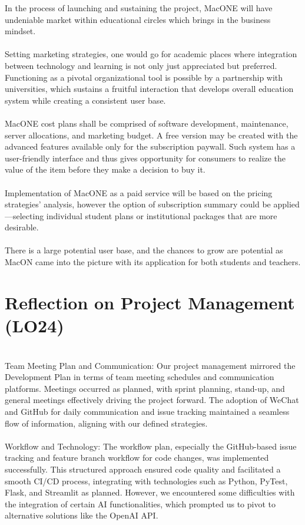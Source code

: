 \documentclass{article}
\begin{document}
In the process of launching and sustaining the project, MacONE will have undeniable market within educational circles which brings in the business mindset.\\
\\
Setting marketing strategies, one would go for academic places where integration between technology and learning is not only just appreciated but preferred. Functioning as a pivotal organizational tool is possible by a partnership with universities, which sustains a fruitful interaction that develops overall education system while creating a consistent user base.\\
\\
MacONE cost plans shall be comprised of software development, maintenance, server allocations, and marketing budget. A free version may be created with the advanced features available only for the subscription paywall. Such system has a user-friendly interface and thus gives opportunity for consumers to realize the value of the item before they make a decision to buy it.\\
\\
Implementation of MacONE as a paid service will be based on the pricing strategies' analysis, however the option of subscription summary could be applied—selecting individual student plans or institutional packages that are more desirable.\\
\\
There is a large potential user base, and the chances to grow are potential as MacON came into the picture with its application for both students and teachers. 





\section{Reflection on Project Management (LO24)}
\\
Team Meeting Plan and Communication:
Our project management mirrored the Development Plan in terms of team meeting schedules and communication platforms. Meetings occurred as planned, with sprint planning, stand-up, and general meetings effectively driving the project forward. The adoption of WeChat and GitHub for daily communication and issue tracking maintained a seamless flow of information, aligning with our defined strategies.
\\
\\
Workflow and Technology:
The workflow plan, especially the GitHub-based issue tracking and feature branch workflow for code changes, was implemented successfully. This structured approach ensured code quality and facilitated a smooth CI/CD process, integrating with technologies such as Python, PyTest, Flask, and Streamlit as planned. However, we encountered some difficulties with the integration of certain AI functionalities, which prompted us to pivot to alternative solutions like the OpenAI API.
\end{document}
